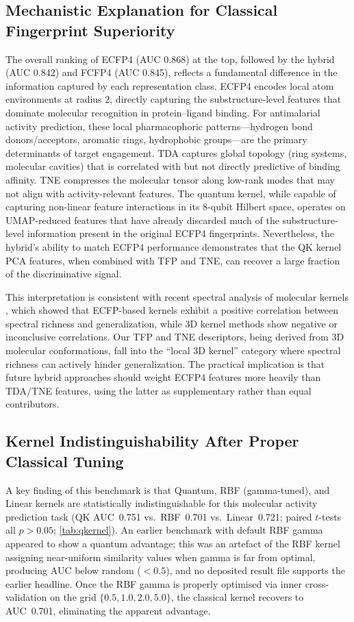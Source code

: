 \documentclass[11pt,a4paper]{article}
\begin{document}
\subsection{Mechanistic Explanation for Classical Fingerprint Superiority}

The overall ranking of ECFP4 (AUC 0.868) at the top, followed by the hybrid (AUC 0.842) and FCFP4 (AUC 0.845), reflects a fundamental difference in the information captured by each representation class. ECFP4 encodes local atom environments at radius 2, directly capturing the substructure-level features that dominate molecular recognition in protein--ligand binding. For antimalarial activity prediction, these local pharmacophoric patterns---hydrogen bond donors/acceptors, aromatic rings, hydrophobic groups---are the primary determinants of target engagement. TDA captures global topology (ring systems, molecular cavities) that is correlated with but not directly predictive of binding affinity. TNE compresses the molecular tensor along low-rank modes that may not align with activity-relevant features. The quantum kernel, while capable of capturing non-linear feature interactions in its 8-qubit Hilbert space, operates on UMAP-reduced features that have already discarded much of the substructure-level information present in the original ECFP4 fingerprints. Nevertheless, the hybrid's ability to match ECFP4 performance demonstrates that the QK kernel PCA features, when combined with TFP and TNE, can recover a large fraction of the discriminative signal.

This interpretation is consistent with recent spectral analysis of molecular kernels \citep{jamali2026spectralanalysismolecularfeatures}, which showed that ECFP-based kernels exhibit a positive correlation between spectral richness and generalization, while 3D kernel methods show negative or inconclusive correlations. Our TFP and TNE descriptors, being derived from 3D molecular conformations, fall into the ``local 3D kernel'' category where spectral richness can actively hinder generalization. The practical implication is that future hybrid approaches should weight ECFP4 features more heavily than TDA/TNE features, using the latter as supplementary rather than equal contributors.

\subsection{Kernel Indistinguishability After Proper Classical Tuning}

A key finding of this benchmark is that Quantum, RBF (gamma-tuned), and Linear kernels are statistically indistinguishable for this molecular activity prediction task (QK AUC~0.751 vs.~RBF~0.701 vs.~Linear~0.721; paired $t$-tests all $p > \num{0.05}$; \cref{tab:qkernel}). An earlier benchmark with default RBF gamma appeared to show a quantum advantage; this was an artefact of the RBF kernel assigning near-uniform similarity values when gamma is far from optimal, producing AUC below random ($< 0.5$), and no deposited result file supports the earlier headline. Once the RBF gamma is properly optimised via inner cross-validation on the grid $\{0.5, 1.0, 2.0, 5.0\}$, the classical kernel recovers to AUC~0.701, eliminating the apparent advantage.
\end{document}

